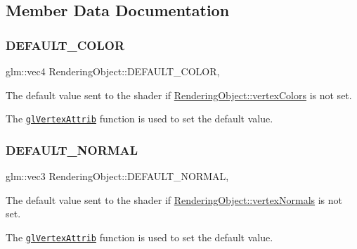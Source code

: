 \subsection{Member Data Documentation}
\hypertarget{class_rendering_object_a3bf21996dc0ef604b2b81d95275c97f9}{}\label{class_rendering_object_a3bf21996dc0ef604b2b81d95275c97f9} 
\subsubsection{\texorpdfstring{D\+E\+F\+A\+U\+L\+T\+\_\+\+C\+O\+L\+OR}{DEFAULT\_COLOR}}
{\footnotesize\ttfamily glm\+::vec4 Rendering\+Object\+::\+D\+E\+F\+A\+U\+L\+T\+\_\+\+C\+O\+L\+OR\hspace{0.3cm}{\ttfamily [static]}, {\ttfamily [protected]}}



The default value sent to the shader if \hyperlink{class_rendering_object_a65fc52e665791ce55e43106b603e917a}{Rendering\+Object\+::vertex\+Colors} is not set. 

The \href{https://www.opengl.org/sdk/docs/man/html/glVertexAttrib.xhtml}{\tt gl\+Vertex\+Attrib} function is used to set the default value. \hypertarget{class_rendering_object_af270a476ba12c23fefbb034e21930add}{}\label{class_rendering_object_af270a476ba12c23fefbb034e21930add} 
\subsubsection{\texorpdfstring{D\+E\+F\+A\+U\+L\+T\+\_\+\+N\+O\+R\+M\+AL}{DEFAULT\_NORMAL}}
{\footnotesize\ttfamily glm\+::vec3 Rendering\+Object\+::\+D\+E\+F\+A\+U\+L\+T\+\_\+\+N\+O\+R\+M\+AL\hspace{0.3cm}{\ttfamily [static]}, {\ttfamily [protected]}}



The default value sent to the shader if \hyperlink{class_rendering_object_ac28d301f97d29ab603f65f8e823063b4}{Rendering\+Object\+::vertex\+Normals} is not set. 

The \href{https://www.opengl.org/sdk/docs/man/html/glVertexAttrib.xhtml}{\tt gl\+Vertex\+Attrib} function is used to set the default value. \hypertarget{class_rendering_object_a3dcb28a12f578630aea75cc59ea39588}{}\label{class_rendering_object_a3dcb28a12f578630aea75cc59ea39588} 
